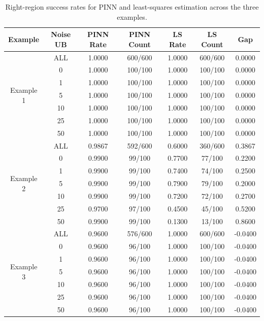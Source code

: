 \documentclass[11pt]{article}
\begin{document}
\begin{table}[H]
\centering
\small
\renewcommand{\arraystretch}{1.15}
\setlength{\tabcolsep}{5pt}
\caption{Right-region success rates for PINN and least-squares estimation across the three examples.}
\label{tab:right-region-success-combined}
\begin{tabular}{|c|c|c|c|c|c|c|}
\hline
\textbf{Example} & \textbf{Noise UB} & \textbf{PINN Rate} & \textbf{PINN Count} & \textbf{LS Rate} & \textbf{LS Count} & \textbf{Gap} \\
\hline

\multirow{7}{*}{Example 1}
& ALL & 1.0000 & 600/600 & 1.0000 & 600/600 & 0.0000 \\
& 0   & 1.0000 & 100/100 & 1.0000 & 100/100 & 0.0000 \\
& 1   & 1.0000 & 100/100 & 1.0000 & 100/100 & 0.0000 \\
& 5   & 1.0000 & 100/100 & 1.0000 & 100/100 & 0.0000 \\
& 10  & 1.0000 & 100/100 & 1.0000 & 100/100 & 0.0000 \\
& 25  & 1.0000 & 100/100 & 1.0000 & 100/100 & 0.0000 \\
& 50  & 1.0000 & 100/100 & 1.0000 & 100/100 & 0.0000 \\
\hline

\multirow{7}{*}{Example 2}
& ALL & 0.9867 & 592/600 & 0.6000 & 360/600 & 0.3867 \\
& 0   & 0.9900 & 99/100  & 0.7700 & 77/100 & 0.2200 \\
& 1   & 0.9900 & 99/100  & 0.7400 & 74/100 & 0.2500 \\
& 5   & 0.9900 & 99/100  & 0.7900 & 79/100  & 0.2000 \\
& 10  & 0.9900 & 99/100  & 0.7200 & 72/100  & 0.2700 \\
& 25  & 0.9700 & 97/100  & 0.4500 & 45/100  & 0.5200 \\
& 50  & 0.9900 & 99/100  & 0.1300 & 13/100  & 0.8600 \\
\hline

\multirow{7}{*}{Example 3}
& ALL & 0.9600 & 576/600 & 1.0000 & 600/600 & -0.0400 \\
& 0   & 0.9600 & 96/100  & 1.0000 & 100/100 & -0.0400 \\
& 1   & 0.9600 & 96/100  & 1.0000 & 100/100 & -0.0400 \\
& 5   & 0.9600 & 96/100  & 1.0000 & 100/100 & -0.0400 \\
& 10  & 0.9600 & 96/100  & 1.0000 & 100/100 & -0.0400 \\
& 25  & 0.9600 & 96/100  & 1.0000 & 100/100 & -0.0400 \\
& 50  & 0.9600 & 96/100  & 1.0000 & 100/100 & -0.0400 \\
\hline
\end{tabular}
\end{table}
\end{document}
